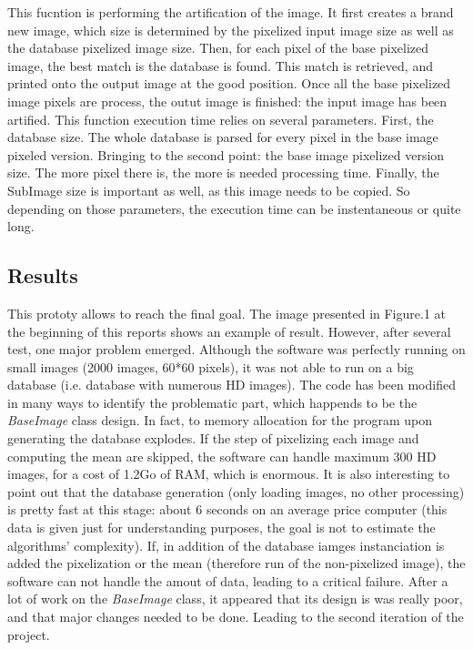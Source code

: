 \documentclass[aps,letterpaper,11pt]{revtex4}
\begin{document}
This fucntion is performing the artification of the image. It first creates a brand new image, which size is determined by the pixelized input image size as well as the database pixelized image size.
Then, for each pixel of the base pixelized image, the best match is the database is found. This match is retrieved, and printed onto the output image at the good position.
Once all the base pixelized image pixels are process, the outut image is finished: the input image has been artified. 
This function execution time relies on several parameters. First, the database size. The whole database is parsed for every pixel in the base image pixeled version. Bringing to the second point: the base image pixelized version size. The more pixel there is, the more is needed processing time. Finally, the SubImage size is important as well, as this image needs to be copied.
So depending on those parameters, the execution time can be instentaneous or quite long.

\subsection{Results}
This prototy allows to reach the final goal. The image presented in Figure.1 at the beginning of this reports shows an example of result. However, after several test, one major problem emerged.
Although the software was perfectly running on small images (2000 images, 60*60 pixels), it was not able to run on a big database (i.e. database with numerous HD images). The code has been modified in many ways to identify the problematic part, which happends to be the \textit{BaseImage} class design.
In fact, to memory allocation for the program upon generating the database explodes. If the step of pixelizing each image and computing the mean are skipped, the software can handle maximum 300 HD images, for a cost of 1.2Go of RAM, which is enormous. It is also interesting to point out that the database generation (only loading images, no other processing) is pretty fast at this stage: about 6 seconds on an average price computer (this data is given just for understanding purposes, the goal is not to estimate the algorithms' complexity). If, in addition of the database iamges instanciation is added the pixelization or the mean (therefore run of the non-pixelized image), the software can not handle the amout of data, leading to a critical failure.
After a lot of work on the \textit{BaseImage} class, it appeared that its design is was really poor, and that major changes needed to be done. Leading to the second iteration of the project.
\end{document}
